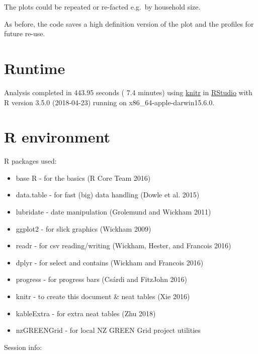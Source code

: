 \documentclass[]{article}
\providecommand{\tightlist}{%
  \setlength{\itemsep}{0pt}\setlength{\parskip}{0pt}}
\begin{document}
The plots could be repeated or re-facted e.g.~by household size.

As before, the code saves a high definition version of the plot and the
profiles for future re-use.

\section{Runtime}\label{runtime}

Analysis completed in 443.95 seconds ( 7.4 minutes) using
\href{https://cran.r-project.org/package=knitr}{knitr} in
\href{http://www.rstudio.com}{RStudio} with R version 3.5.0 (2018-04-23)
running on x86\_64-apple-darwin15.6.0.

\section{R environment}\label{r-environment}

R packages used:

\begin{itemize}
\tightlist
\item
  base R - for the basics (R Core Team 2016)
\item
  data.table - for fast (big) data handling (Dowle et al. 2015)
\item
  lubridate - date manipulation (Grolemund and Wickham 2011)
\item
  ggplot2 - for slick graphics (Wickham 2009)
\item
  readr - for csv reading/writing (Wickham, Hester, and Francois 2016)
\item
  dplyr - for select and contains (Wickham and Francois 2016)
\item
  progress - for progress bars (Csárdi and FitzJohn 2016)
\item
  knitr - to create this document \& neat tables (Xie 2016)
\item
  kableExtra - for extra neat tables (Zhu 2018)
\item
  nzGREENGrid - for local NZ GREEN Grid project utilities
\end{itemize}

Session info:
\end{document}
